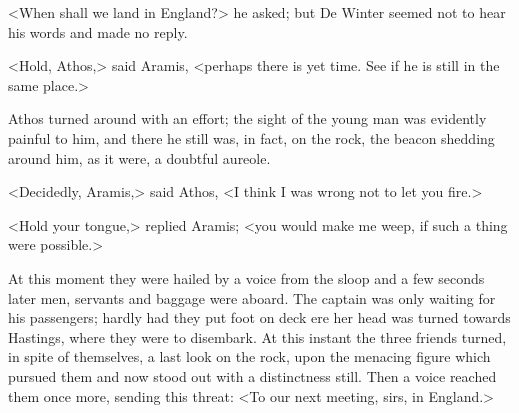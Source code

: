 <When shall we land in England?> he asked; but De Winter seemed not to hear his words and made no reply.

<Hold, Athos,> said Aramis, <perhaps there is yet time. See if he is still in the same place.>

Athos turned around with an effort; the sight of the young man was evidently painful to him, and there he still was, in fact, on the rock, the beacon shedding around him, as it were, a doubtful aureole.

<Decidedly, Aramis,> said Athos, <I think I was wrong not to let you fire.>

<Hold your tongue,> replied Aramis; <you would make me weep, if such a thing were possible.>

At this moment they were hailed by a voice from the sloop and a few seconds later men, servants and baggage were aboard. The captain was only waiting for his passengers; hardly had they put foot on deck ere her head was turned towards Hastings, where they were to disembark. At this instant the three friends turned, in spite of themselves, a last look on the rock, upon the menacing figure which pursued them and now stood out with a distinctness still. Then a voice reached them once more, sending this threat: <To our next meeting, sirs, in England.> 